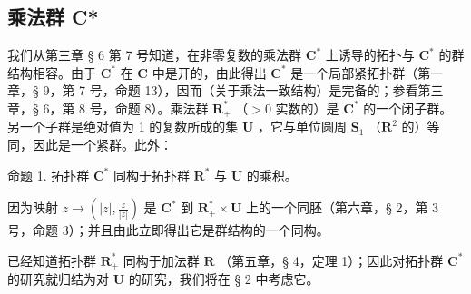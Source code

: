 \subsection{乘法群 C*}

我们从第三章 § 6 第 7 号知道，在非零复数的乘法群 \(\mathbf{C}^*\) 上诱导的拓扑与 \(\mathbf{C}^*\) 的群结构相容。由于 \(\mathbf{C}^*\) 在 \(\mathbf{C}\) 中是开的，由此得出 \(\mathbf{C}^*\) 是一个局部紧拓扑群（第一章，§ 9，第 7 号，命题 13），因而（关于乘法一致结构）是完备的；参看第三章，§ 6，第 8 号，命题 8）。乘法群 \(\mathbf{R}_+^*\) （\(>0\) 实数的）是 \(\mathbf{C}^*\) 的一个闭子群。另一个子群是绝对值为 1 的复数所成的集 \(\mathbf{U}\) ，它与单位圆周 \(\mathbf{S}_1\) （\(\mathbf{R}^2\) 的）等同，因此是一个紧群。此外：

命题 1. 拓扑群 \(\mathbf{C}^*\) 同构于拓扑群 \(\mathbf{R}^*\) 与 \(\mathbf{U}\) 的乘积。

因为映射 \(z \to \left( |z|, \frac{z}{|z|} \right)\) 是 \(\mathbf{C}^*\) 到 \(\mathbf{R}_+^* \times \mathbf{U}\) 上的一个同胚（第六章，§ 2，第 3 号，命题 3）；并且由此立即得出它是群结构的一个同构。

已经知道拓扑群 \(\mathbf{R}_{+}^{*}\) 同构于加法群 \(\mathbf{R}\) （第五章，§ 4，定理 1）；因此对拓扑群 \(\mathbf{C}^{*}\) 的研究就归结为对 \(\mathbf{U}\) 的研究，我们将在 § 2 中考虑它。

